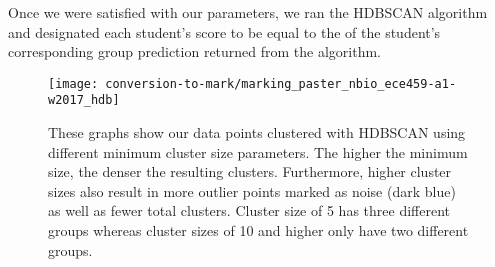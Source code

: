 Once we were satisfied with our parameters, we ran the HDBSCAN algorithm and designated each student's score to be equal to the  of the student's corresponding group prediction returned from the algorithm.

\begin{figure}
\texttt{[image: conversion-to-mark/marking\_paster\_nbio\_ece459-a1-w2017\_hdb]}
\caption[HDBSCAN Clustering]{These graphs show our data points clustered with HDBSCAN using different minimum cluster size parameters. The higher the minimum size, the denser the resulting clusters. Furthermore, higher cluster sizes also result in more outlier points marked as noise (dark blue) as well as fewer total clusters. Cluster size of 5 has three different groups whereas cluster sizes of 10 and higher only have two different groups.}
\label{fig:ctm-hdb}
\end{figure}
